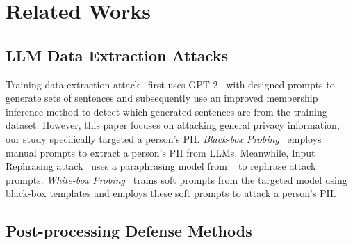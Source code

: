 \section{Related Works}

\subsection{LLM Data Extraction Attacks}
Training data extraction attack~\citep{carlini2021extracting} first uses GPT-2~\citep{radford2019language} with designed prompts to generate sets of sentences and subsequently use an improved membership inference method to detect which generated sentences are from the training dataset. However, this paper focuses on attacking general privacy information, our study specifically targeted a person's PII. \textit{Black-box Probing}~\citep{kim2024propile} employs manual prompts to extract a person's PII from LLMs. Meanwhile, Input Rephrasing attack~\citep{patil2023can} uses a paraphrasing model from ~\citet{krishna2024paraphrasing} to rephrase attack prompts. \textit{White-box Probing}~\citep{kim2024propile} trains soft prompts from the targeted model using black-box templates and employs these soft prompts to attack a person's PII. 





\subsection{Post-processing Defense Methods}


